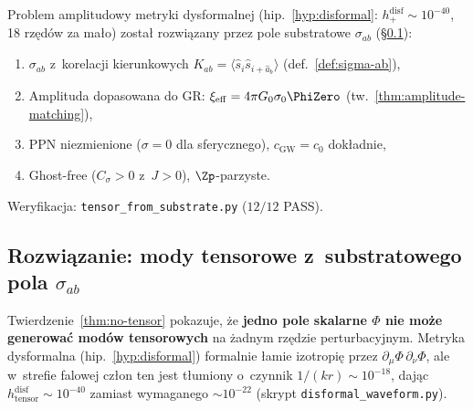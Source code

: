 \begin{problem}\label{prob:tensor-modes}
Problem amplitudowy metryki dysformalnej
(hip.~\ref{hyp:disformal}: $h_+^{\mathrm{disf}}
\sim 10^{-40}$, 18 rz\k{e}d\'ow za ma\l{}o)
zosta\l{} rozwi\k{a}zany przez pole substratowe $\sigma_{ab}$
(\S\ref{ssec:tensor-substrate}):
\begin{enumerate}[nosep]
  \item[\checkmark] $\sigma_{ab}$ z~korelacji kierunkowych
    $K_{ab} = \langle\hat{s}_i\hat{s}_{i+\hat{a}_b}\rangle$
    (def.~\ref{def:sigma-ab}),
  \item[\checkmark] Amplituda dopasowana do GR:
    $\xi_{\mathrm{eff}} = 4\pi G_0\sigma_0\PhiZero$
    (tw.~\ref{thm:amplitude-matching}),
  \item[\checkmark] PPN niezmienione ($\sigma = 0$ dla sferycznego),
    $c_{\mathrm{GW}} = c_0$ dok\l{}adnie,
  \item[\checkmark] Ghost-free ($C_\sigma > 0$ z~$J > 0$),
    $\Zp$-parzyste.
\end{enumerate}
Weryfikacja: \texttt{tensor\_from\_substrate.py} ($12/12$ PASS).
\end{problem}

\subsection{Rozwi\k{a}zanie: mody tensorowe z~substratowego pola $\sigma_{ab}$}%
\label{ssec:tensor-substrate}

\noindent{}

\medskip
Twierdzenie~\ref{thm:no-tensor} pokazuje, \.ze
\textbf{jedno pole skalarne $\Phi$ nie mo\.ze generowa\'c
mod\'ow tensorowych} na \.zadnym rz\k{e}dzie perturbacyjnym.
Metryka dysformalna (hip.~\ref{hyp:disformal}) formalnie
\l{}amie izotropi\k{e} przez $\partial_\mu\Phi\,\partial_\nu\Phi$,
ale w~strefie falowej cz\l{}on ten jest t\l{}umiony
o~czynnik $1/(kr) \sim 10^{-18}$, daj\k{a}c
$h_{\mathrm{tensor}}^{\mathrm{disf}} \sim 10^{-40}$
zamiast wymaganego $\sim 10^{-22}$
(skrypt \texttt{disformal\_waveform.py}).

